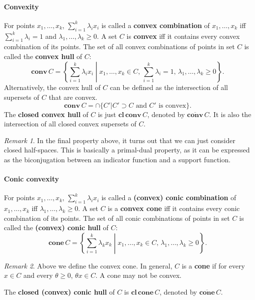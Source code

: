 \documentclass[openany]{book}
\theoremstyle{definition}
\theoremstyle{remark}
\newtheorem*{remark}{Remark}
\begin{document}
\paragraph{Convexity}
For points $x_1,\ldots,x_k$, $\sum_{i=1}^k\lambda_ix_i$ is called a \textbf{convex combination} of $x_1,\ldots,x_k$ iff $\sum_{i=1}^k\lambda_i=1$ and $\lambda_1,\ldots,\lambda_k\ge0$. A set $C$ is \textbf{convex} iff it contains every convex combination of its points. The set of all convex combinations of points in set $C$ is called the \textbf{convex hull} of $C$:
\begin{equation}\label{convHullInner}
\mathbf{conv}\,C=\left\{\sum_{i=1}^k\lambda_ix_i\middle|x_1,\ldots,x_k\in C,\,\sum_{i=1}^k\lambda_i=1,\,\lambda_1,\ldots,\lambda_k\ge0\right\}.
\end{equation}
Alternatively, the convex hull of $C$ can be defined as the intersection of all supersets of $C$ that are convex.
\begin{equation}\label{convHullOuter}
    \mathbf{conv}\,C=\cap\{C'|C'\supset C\textrm{ and }C'\textrm{ is convex}\}.
\end{equation}
The \textbf{closed convex hull} of $C$ is just $\mathbf{cl}\,\mathbf{conv}\,C$, denoted by $\overline{\mathbf{conv}}\,C$. It is also the intersection of all closed convex supersets of $C$.
\begin{remark}
    In the final property above, it turns out that we can just consider closed half-spaces. This is basically a primal-dual property, as it can be expressed as the biconjugation between an indicator function and a support function.
\end{remark}

\paragraph{Conic convexity}
For points $x_1,\ldots,x_k$, $\sum_{i=1}^k\lambda_ix_i$ is called a \textbf{(convex) conic combination} of $x_1,\ldots,x_k$ iff $\lambda_1,\ldots,\lambda_k\ge0$. A set $C$ is a \textbf{convex cone} iff it contains every conic combination of its points. The set of all conic combinations of points in set $C$ is called the \textbf{(convex) conic hull} of $C$:
\begin{equation}\label{conicHull}
\mathbf{cone}\,C=\left\{\sum_{i=1}^k\lambda_kx_k\middle|x_1,\ldots,x_k\in C,\,\lambda_1,\ldots,\lambda_k\ge0\right\}.
\end{equation}
\begin{remark}
    Above we define the convex cone. In general, $C$ is a \textbf{cone} if for every $x\in C$ and every $\theta\ge0$, $\theta x\in C$. A cone may not be convex.
\end{remark}
The \textbf{closed (convex) conic hull} of $C$ is $\mathbf{cl}\,\mathbf{cone}\,C$, denoted by $\overline{\mathbf{cone}}\,C$.
\end{document}

